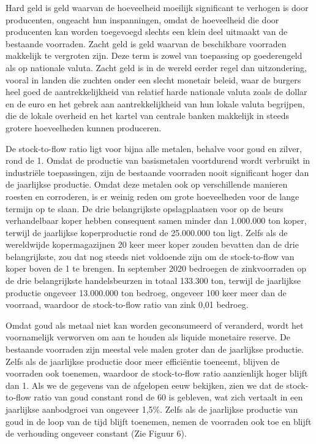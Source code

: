 Hard geld is geld waarvan de hoeveelheid moeilijk significant te verhogen is door producenten, ongeacht hun inspanningen, omdat de hoeveelheid die door producenten kan worden toegevoegd slechts een klein deel uitmaakt van de bestaande voorraden. Zacht geld is geld waarvan de beschikbare voorraden makkelijk te vergroten zijn. Deze term is zowel van toepassing op goederengeld als op nationale valuta. Zacht geld is in de wereld eerder regel dan uitzondering, vooral in landen die zuchten onder een slecht monetair beleid, waar de burgers heel goed de aantrekkelijkheid van relatief harde nationale valuta zoals de dollar en de euro en het gebrek aan aantrekkelijkheid van hun lokale valuta begrijpen, die de lokale overheid en het kartel van centrale banken makkelijk in steeds grotere hoeveelheden kunnen produceren.

De stock-to-flow ratio ligt voor bijna alle metalen, behalve voor goud en zilver, rond de 1. Omdat de productie van basismetalen voortdurend wordt verbruikt in industriële toepassingen, zijn de bestaande voorraden nooit significant hoger dan de jaarlijkse productie. Omdat deze metalen ook op verschillende manieren roesten en corroderen, is er weinig reden om grote hoeveelheden voor de lange termijn op te slaan. De drie belangrijkste opslagplaatsen voor op de beurs verhandelbaar koper hebben consequent samen minder dan 1.000.000 ton koper, terwijl de jaarlijkse koperproductie rond de 25.000.000 ton ligt.\autocite{111} Zelfs als de wereldwijde kopermagazijnen 20 keer meer koper zouden bevatten dan de drie belangrijkste, zou dat nog steeds niet voldoende zijn om de stock-to-flow van koper boven de 1 te brengen. In september 2020 bedroegen de zinkvoorraden op de drie belangrijkste handelsbeurzen in totaal 133.300 ton, terwijl de jaarlijkse productie ongeveer 13.000.000 ton bedroeg, ongeveer 100 keer meer dan de voorraad, waardoor de stock-to-flow ratio van zink 0,01 bedroeg.\autocite{112}

Omdat goud als metaal niet kan worden geconsumeerd of veranderd, wordt het voornamelijk verworven om aan te houden als liquide monetaire reserve. De bestaande voorraden zijn meestal vele malen groter dan de jaarlijkse productie. Zelfs als de jaarlijkse productie door meer efficiëntie toeneemt, blijven de voorraden ook toenemen, waardoor de stock-to-flow ratio aanzienlijk hoger blijft dan 1. Als we de gegevens van de afgelopen eeuw bekijken, zien we dat de stock-to-flow ratio van goud constant rond de 60 is gebleven, wat zich vertaalt in een jaarlijkse aanbodgroei van ongeveer 1,5\%. Zelfs als de jaarlijkse productie van goud in de loop van de tijd blijft toenemen, nemen de voorraden ook toe en blijft de verhouding ongeveer constant (Zie Figuur 6).

